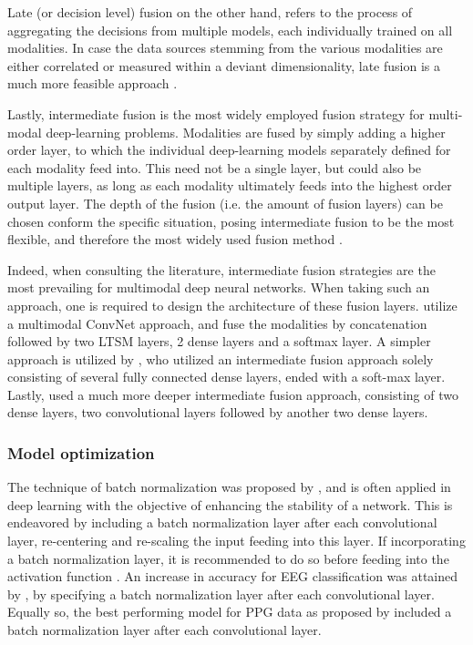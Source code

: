 \documentclass[12pt]{article}
\begin{document}
Late (or decision level) fusion on the other hand, refers to the process of aggregating the decisions from multiple models, each individually trained on all modalities. In case the data sources stemming from the various modalities are either correlated or measured within a deviant dimensionality, late fusion is a much more feasible approach \cite{ramachandram2017deep}.

Lastly, intermediate fusion is the most widely employed fusion strategy for multi-modal deep-learning problems. Modalities are fused by simply adding a higher order layer, to which the individual deep-learning models separately defined for each modality feed into. This need not be a single layer, but could also be multiple layers, as long as each modality ultimately feeds into the highest order output layer. The depth of the fusion (i.e. the amount of fusion layers) can be chosen conform the specific situation, posing intermediate fusion to be the most flexible, and therefore the most widely used fusion method \cite{ramachandram2017deep}.

Indeed, when consulting the literature, intermediate fusion strategies are the most prevailing for multimodal deep neural networks. When taking such an approach, one is required to design the architecture of these fusion layers.   utilize a multimodal ConvNet approach, and fuse the modalities by concatenation followed by two LTSM layers, 2 dense layers and a softmax layer. A simpler approach is utilized by	, who utilized an intermediate fusion approach solely consisting of several fully connected dense layers, ended with a soft-max layer. Lastly,  used a much more deeper intermediate fusion approach, consisting of two dense layers, two convolutional layers followed by another two dense layers.  

\subsubsection{Model optimization}
The technique of batch normalization was proposed by  ,  and is often applied in deep learning with the objective of enhancing the stability of a network. This is endeavored by including a batch normalization layer after each convolutional layer, re-centering and re-scaling the input feeding into this layer. If incorporating a batch normalization layer, it is recommended to do so before feeding into the activation function \cite{ioffe2015batch}. An increase in accuracy for EEG classification was attained by ,   by specifying a batch normalization layer after each convolutional layer. Equally so, the best performing model for PPG data as proposed by  included a batch normalization layer after each convolutional layer.  
\end{document}
